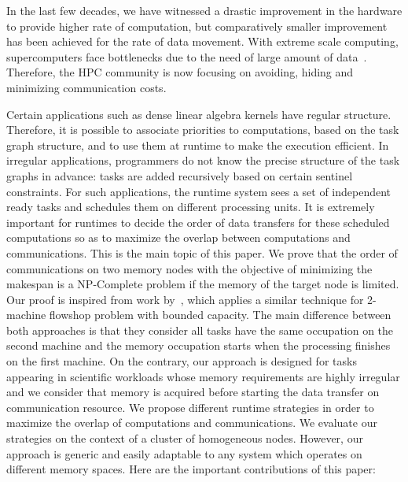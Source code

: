 \documentclass[sigconf]{acmart}
\begin{document}
	
	
	
	In the last few decades, we have witnessed a drastic improvement in the hardware to provide higher rate of computation, but comparatively smaller improvement has been achieved for the rate of data movement. With extreme scale computing, supercomputers face bottlenecks due to the need of large amount of data~\cite{ascaccommitteereport2014,yelick2016}. Therefore, the HPC community is now focusing on avoiding, hiding and minimizing communication costs.
	
	
	Certain applications such as dense linear algebra kernels have regular structure. Therefore, it is possible to associate priorities to computations, based on the task graph structure, and to use them at runtime to make the execution efficient. In irregular applications, programmers do not know the precise structure of the task graphs in advance: tasks are added recursively based on certain sentinel constraints. For such applications, the runtime system sees a set of independent ready tasks and schedules them on different processing units. It is extremely important for runtimes to decide the order of data transfers for these scheduled computations so as to maximize the overlap between computations and communications. This is the main topic of this paper. We prove that the order of communications on two memory nodes with the objective of minimizing the makespan is a NP-Complete problem if the memory of the target node is limited. Our proof is inspired from work by~\cite{Papadimitriou:1980:FSL:322203.322213}, which applies a similar technique for 2-machine flowshop problem with bounded capacity. The main difference between both approaches is that they consider all tasks have the same occupation on the second machine and the memory occupation starts when the processing finishes on the first machine. On the contrary, our approach is designed for tasks appearing in scientific workloads whose memory requirements are highly irregular and we consider that memory is acquired before starting the data transfer on communication resource. We propose different runtime strategies in order to maximize the overlap of computations and communications. We evaluate our strategies on the context of a cluster of homogeneous nodes. However, our approach is generic and easily adaptable to any system which operates on different memory spaces. Here are the important contributions of this paper:
	
\end{document}
